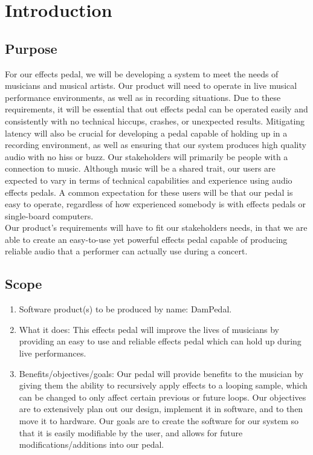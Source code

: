 \section{Introduction}
\subsection{Purpose}
For our effects pedal, we will be developing a system to meet the needs of musicians and musical artists. Our product will need to operate in live musical performance environments, as well as in recording situations. Due to these requirements, it will be essential that out effects pedal can be operated easily and consistently with no technical hiccups, crashes, or unexpected results. Mitigating latency will also be crucial for developing a pedal capable of holding up in a recording environment, as well as ensuring that our system produces high quality audio with no hiss or buzz. 
Our stakeholders will primarily be people with a connection to music. Although music will be a shared trait, our users are expected to vary in terms of technical capabilities and experience using audio effects pedals. A common expectation for these users will be that our pedal is easy to operate, regardless of how experienced somebody is with effects pedals or single-board computers.\\
Our product's requirements will have to fit our stakeholders needs, in that we are able to create an easy-to-use yet powerful effects pedal capable of producing reliable audio that a performer can actually use during a concert. 

\subsection{Scope}
    \begin{enumerate}[label=\alph*.]
        \item Software product(s) to be produced by name: DamPedal.
        \item What it does: This effects pedal will improve the lives of musicians by providing an easy to use and reliable effects pedal which can hold up during live performances.
        \item Benefits/objectives/goals: Our pedal will provide benefits to the musician by giving them the ability to recursively apply effects to a looping sample, which can be changed to only affect certain previous or future loops. Our objectives are to extensively plan out our design, implement it in software, and to then move it to hardware. Our goals are to create the software for our system so that it is easily modifiable by the user, and allows for future modifications/additions into our pedal.
\end{enumerate}

